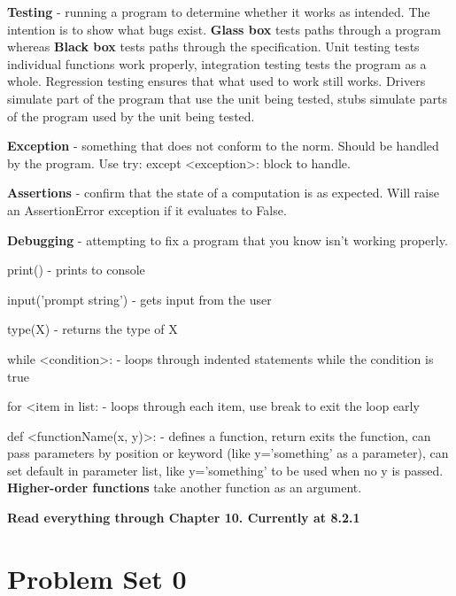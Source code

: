 \textbf{Testing} - running a program to determine whether it works as intended. The intention is to show what bugs exist. \textbf{Glass box} tests paths through a program whereas \textbf{Black box} tests paths through the specification. Unit testing tests individual functions work properly, integration testing tests the program as a whole. Regression testing ensures that what used to work still works. Drivers simulate part of the program that use the unit being tested, stubs simulate parts of the program used by the unit being tested.

\textbf{Exception} - something that does not conform to the norm. Should be handled by the program. Use try: except <exception>: block to handle.

\textbf{Assertions} - confirm that the state of a computation is as expected. Will raise an AssertionError exception if it evaluates to False.

\textbf{Debugging} - attempting to fix a program that you know isn't working properly.

print() - prints to  console 

input('prompt string') - gets input from the user

type(X) - returns the type of X

while <condition>: - loops through indented statements while the condition is true

for <item in list: - loops through each item, use break to exit the loop early

def <functionName(x, y)>: - defines a function, return exits the function, can pass parameters by position or keyword (like y='something' as a parameter), can set default in parameter list, like y='something' to be used when no y is passed. \textbf{Higher-order functions} take another function as an argument.





\textbf{Read everything through Chapter 10. Currently at 8.2.1}

\newpage
\onecolumn
\section{Problem Set 0}

\begin{problem}{}
\end{problem}
\begin{solution}
\end{solution}

